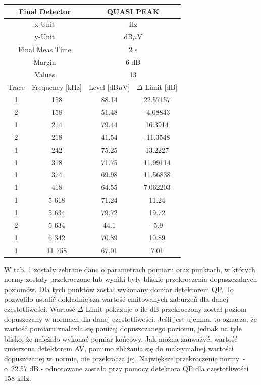 \documentclass[12pt, a4paper, oneside]{article}
\begin{document}
\begin{table}[h!]
\begin{tabular}{|c|c|c|c|}
    \multicolumn{2}{|c|}{Final Detector} & \multicolumn{2}{|c|}{QUASI PEAK} \\\hline
    \multicolumn{2}{|c|}{x-Unit} & \multicolumn{2}{|c|}{Hz} \\\hline
    \multicolumn{2}{|c|}{y-Unit} & \multicolumn{2}{|c|}{dB$\mu$V} \\\hline
    \multicolumn{2}{|c|}{Final Meas Time} & \multicolumn{2}{|c|}{2 s} \\\hline
    \multicolumn{2}{|c|}{Margin} & \multicolumn{2}{|c|}{6 dB} \\\hline
    \multicolumn{2}{|c|}{Values} & \multicolumn{2}{|c|}{13} \\\hline
    Trace & Frequency [kHz] & Level [dB$\mu$V] & $\Delta$ Limit [dB] \\\hline
    1 & 158   & 88.14 & 22.57157 \\\hline
    2 & 158   & 51.48 & -4.08843 \\\hline
    1 & 214   & 79.44 & 16.3914 \\\hline
    2 & 218   & 41.54 & -11.3548 \\\hline
    1 & 242   & 75.25 & 13.2227 \\\hline
    1 & 318   & 71.75 & 11.99114 \\\hline
    1 & 374   & 69.98 & 11.56838 \\\hline
    1 & 418   & 64.55 & 7.062203 \\\hline
    1 & 5 618   & 71.24 & 11.24 \\\hline
    1 & 5 634   & 79.72 & 19.72 \\\hline
    2 & 5 634   & 44.1 & -5.9 \\\hline
    1 & 6 342   & 70.89 & 10.89 \\\hline
    1 & 11 758   & 67.01 & 7.01 \\\hline
    \end{tabular}%
  \label{tab:addlabel}%
\end{table}%
W tab. 1 zostały zebrane dane o parametrach pomiaru oraz punktach, w których normy zostały przekroczone lub wyniki były bliskie przekroczenia dopuszczalnych poziomów. Dla tych punktów został wykonany domiar detektorem QP. To pozwoliło ustalić dokładniejszą wartość emitowanych zaburzeń dla danej częstotliwości. Wartość $\Delta$ Limit pokazuje o ile dB przekroczony został poziom dopuszczany w normach dla danej częstotliwości. Jeśli jest ujemna, to oznacza, że wartość pomiaru znalazła się poniżej dopuszczanego poziomu, jednak na tyle blisko, że należało wykonać pomiar końcowy. Jak można zauważyć, wartość zmierzona detektorem AV, pomimo zbliżania się do maksymalnej wartości dopuszczanej w~normie, nie przekracza jej. Największe przekroczenie normy~- o~22.57 dB - odnotowane zostało przy pomocy detektora QP dla częstotliwości 158 kHz.
\end{document}
